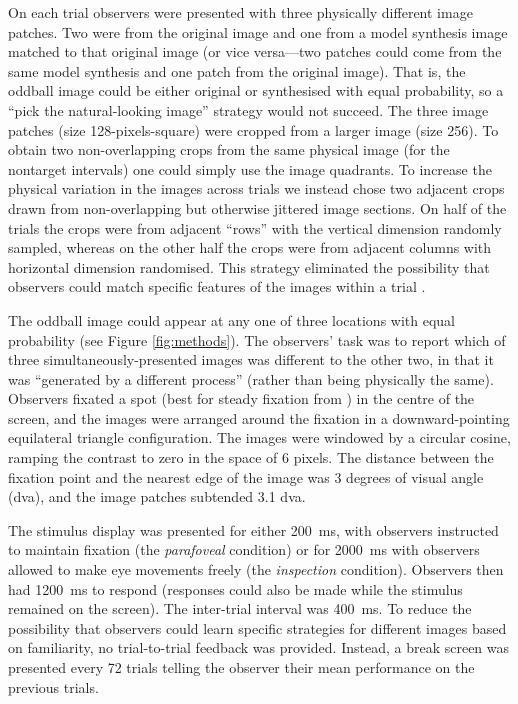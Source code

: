\documentclass[article, 11pt,a4paper,natbib]{apa6}\usepackage[]{graphicx}\usepackage[]{color}
\begin{document}
On each trial observers were presented with three physically different image patches.
Two were from the original image and one from a model synthesis image matched to that original image (or vice versa---two patches could come from the same model synthesis and one patch from the original image).
That is, the oddball image could be either original or synthesised with equal probability, so a ``pick the natural-looking image'' strategy would not succeed.
The three image patches (size 128-pixels-square) were cropped from a larger image (size 256).
To obtain two non-overlapping crops from the same physical image (for the nontarget intervals) one could simply use the image quadrants. 
To increase the physical variation in the images across trials we instead chose two adjacent crops drawn from non-overlapping but otherwise jittered image sections.
On half of the trials the crops were from adjacent ``rows'' with the vertical dimension randomly sampled, whereas on the other half the crops were from adjacent columns with horizontal dimension randomised.
This strategy eliminated the possibility that observers could match specific features of the images within a trial \citep[as in][]{balas_texture_2006}.

The oddball image could appear at any one of three locations with equal probability (see Figure \ref{fig:methods}).
The observers' task was to report which of three simultaneously-presented images was different to the other two, in that it was ``generated by a different process'' (rather than being physically the same).
Observers fixated a spot (best for steady fixation from \citet{thaler_what_2013}) in the centre of the screen, and the images were arranged around the fixation in a downward-pointing equilateral triangle configuration.
The images were windowed by a circular cosine, ramping the contrast to zero in the space of 6 pixels.
The distance between the fixation point and the nearest edge of the image was 3 degrees of visual angle (dva), and the image patches subtended 3.1 dva.

The stimulus display was presented for either 200~ms, with observers instructed to maintain fixation (the \textit{parafoveal} condition) or for 2000~ms with observers allowed to make eye movements freely (the \textit{inspection} condition).
Observers then had 1200~ms to respond (responses could also be made while the stimulus remained on the screen). 
The inter-trial interval was 400~ms.
To reduce the possibility that observers could learn specific strategies for different images based on familiarity, no trial-to-trial feedback was provided.
Instead, a break screen was presented every 72 trials telling the observer their mean performance on the previous trials.
\end{document}
